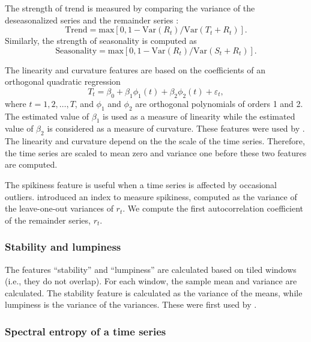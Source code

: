 \documentclass[11pt,a4paper,]{article}
\def\var{\text{Var}}
\begin{document}
The strength of trend is measured by comparing the variance of the deseasonalized series and the remainder series \autocite{wang2009rule}:
\[
    \text{Trend} = \text{max}\left[0, 1 - \var(R_{t})/\var(T_t+R_t)\right].
\]
Similarly, the strength of seasonality is computed as
\[
    \text{Seasonality} = \text{max}\left[0, 1- \var(R_{t})/ \var(S_t+R_t)\right].
\]

The linearity and curvature features are based on the coefficients of an orthogonal quadratic regression
\[
  T_t=\beta_0+\beta_1 \phi_1(t) + \beta_2\phi_2(t) + \varepsilon_t,
\]
where \(t=1, 2, \dots,T\), and \(\phi_1\) and \(\phi_2\) are orthogonal polynomials of orders 1 and 2. The estimated value of \(\beta_1\) is used as a measure of linearity while the estimated value of \(\beta_2\) is considered as a measure of curvature. These features were used by \textcite{hyndman2015large}. The linearity and curvature depend on the the scale of the time series. Therefore, the time series are scaled to mean zero and variance one before these two features are computed.

The spikiness feature is useful when a time series is affected by occasional outliers. \textcite{hyndman2015large} introduced an index to measure spikiness, computed as the variance of the leave-one-out variances of \(r_t\). We compute the first autocorrelation coefficient of the remainder series, \(r_t\).

\hypertarget{stability-and-lumpiness}{%
\subsubsection*{Stability and lumpiness}\label{stability-and-lumpiness}}

The features ``stability'' and ``lumpiness'' are calculated based on tiled windows (i.e., they do not overlap). For each window, the sample mean and variance are calculated. The stability feature is calculated as the variance of the means, while lumpiness is the variance of the variances. These were first used by \textcite{hyndman2015large}.

\hypertarget{spectral-entropy-of-a-time-series}{%
\subsubsection*{Spectral entropy of a time series}\label{spectral-entropy-of-a-time-series}}
\end{document}
